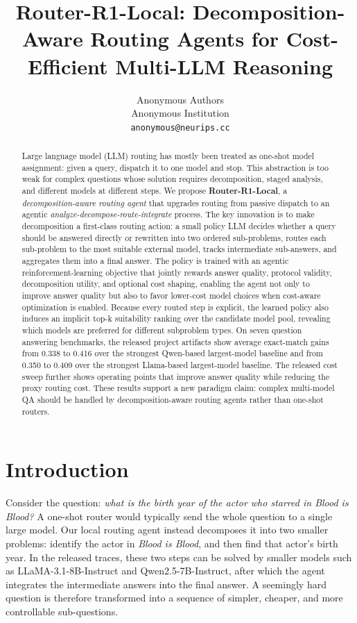 \documentclass{article}
\title{Router-R1-Local: Decomposition-Aware Routing Agents for Cost-Efficient Multi-LLM Reasoning}
\author{%
  Anonymous Authors \\
  Anonymous Institution \\
  \texttt{anonymous@neurips.cc}
}
\begin{document}
\maketitle

\begin{abstract}
Large language model (LLM) routing has mostly been treated as one-shot model assignment: given a query, dispatch it to one model and stop. This abstraction is too weak for complex questions whose solution requires decomposition, staged analysis, and different models at different steps. We propose \textbf{Router-R1-Local}, a \emph{decomposition-aware routing agent} that upgrades routing from passive dispatch to an agentic \emph{analyze-decompose-route-integrate} process. The key innovation is to make decomposition a first-class routing action: a small policy LLM decides whether a query should be answered directly or rewritten into two ordered sub-problems, routes each sub-problem to the most suitable external model, tracks intermediate sub-answers, and aggregates them into a final answer. The policy is trained with an agentic reinforcement-learning objective that jointly rewards answer quality, protocol validity, decomposition utility, and optional cost shaping, enabling the agent not only to improve answer quality but also to favor lower-cost model choices when cost-aware optimization is enabled. Because every routed step is explicit, the learned policy also induces an implicit top-k suitability ranking over the candidate model pool, revealing which models are preferred for different subproblem types. On seven question answering benchmarks, the released project artifacts show average exact-match gains from 0.338 to 0.416 over the strongest Qwen-based largest-model baseline and from 0.350 to 0.409 over the strongest Llama-based largest-model baseline. The released cost sweep further shows operating points that improve answer quality while reducing the proxy routing cost. These results support a new paradigm claim: complex multi-model QA should be handled by decomposition-aware routing agents rather than one-shot routers.
\end{abstract}

\section{Introduction}
\label{sec:intro}

Consider the question: \emph{what is the birth year of the actor who starred in \textit{Blood is Blood}?} A one-shot router would typically send the whole question to a single large model. Our local routing agent instead decomposes it into two smaller problems: identify the actor in \textit{Blood is Blood}, and then find that actor's birth year. In the released traces, these two steps can be solved by smaller models such as LLaMA-3.1-8B-Instruct and Qwen2.5-7B-Instruct, after which the agent integrates the intermediate answers into the final answer. A seemingly hard question is therefore transformed into a sequence of simpler, cheaper, and more controllable sub-questions.
\end{document}
